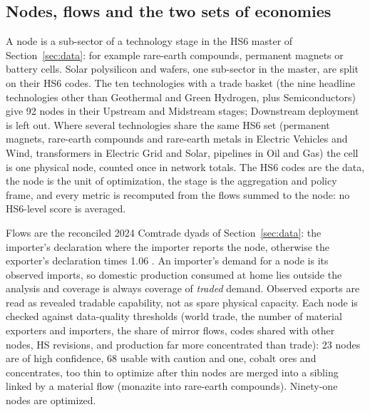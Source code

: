 \subsection{Nodes, flows and the two sets of economies}
\label{subsec:aib_nodes}

A node is a sub-sector of a technology stage in the HS6 master of Section~\ref{sec:data}: for
example rare-earth compounds, permanent magnets or battery cells. Solar polysilicon and wafers,
one sub-sector in the master, are split on their HS6 codes. The ten technologies with a trade
basket (the nine headline technologies other than Geothermal and Green Hydrogen, plus
Semiconductors) give 92 nodes in their Upstream and Midstream stages; Downstream deployment is left
out. Where several technologies share the same HS6 set (permanent magnets, rare-earth compounds and
rare-earth metals in Electric Vehicles and Wind, transformers in Electric Grid and Solar, pipelines in
Oil and Gas) the cell is one physical node, counted once in network totals. The HS6 codes are the
data, the node is the unit of optimization, the stage is the aggregation and policy frame, and every
metric is recomputed from the flows summed to the node: no HS6-level score is averaged.

Flows are the reconciled 2024 Comtrade dyads of Section~\ref{sec:data}: the importer's declaration
where the importer reports the node, otherwise the exporter's declaration times 1.06
\citep{uncomtrade}. An importer's demand for a node is its observed imports, so domestic production
consumed at home lies outside the analysis and coverage is always coverage of \emph{traded} demand.
Observed exports are read as revealed tradable capability, not as spare physical capacity. Each
node is checked against data-quality thresholds (world trade, the number of material exporters and
importers, the share of mirror flows, codes shared with other nodes, HS revisions, and production
far more concentrated than trade): 23 nodes are of high confidence, 68 usable with caution and one,
cobalt ores and concentrates, too thin to optimize after thin nodes are merged into a sibling linked
by a material flow (monazite into rare-earth compounds). Ninety-one nodes are optimized.


